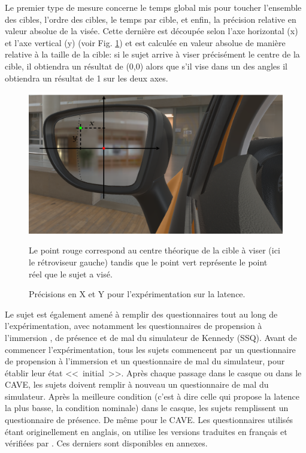 	\par Le premier type de mesure concerne le temps global mis pour toucher l'ensemble des cibles, l'ordre des cibles, le temps par cible, et enfin, la précision relative en valeur absolue de la visée. Cette dernière est découpée selon l'axe horizontal (x) et l'axe vertical (y) (voir Fig. \ref{fig:x_y_precision_latency}) et est calculée en valeur absolue de manière relative à la taille de la cible: si le sujet arrive à viser précisément le centre de la cible, il obtiendra un résultat de (0,0) alors que s'il vise dans un des angles il obtiendra un résultat de 1 sur les deux axes.
	
	\begin{figure}
		\centering
		\includegraphics[scale=.65]{Figures/XYPrecision}
		\caption{Précisions en X et Y pour l'expérimentation sur la latence.}{Le point rouge correspond au centre théorique de la cible à viser (ici le rétroviseur gauche) tandis que le point vert représente le point réel que le sujet a visé.}
		\label{fig:x_y_precision_latency}
	\end{figure}
	
	\par Le sujet est également amené à remplir des questionnaires tout au long de l'expérimentation, avec notamment les questionnaires de propension à l'immersion \citep{witmer_measuring_1998}, de présence \citep{witmer_measuring_1998} et de mal du simulateur de Kennedy (SSQ). Avant de commencer l'expérimentation, tous les sujets commencent par un questionnaire de propension à l'immersion et un questionnaire de mal du simulateur, pour établir leur état <<~initial~>>. Après chaque passage dans le casque ou dans le CAVE, les sujets doivent remplir à nouveau un questionnaire de mal du simulateur. Après la meilleure condition (c'est à dire celle qui propose la latence la plus basse, la condition nominale) dans le casque, les sujets remplissent un questionnaire de présence. De même pour le CAVE. Les questionnaires utilisés étant originellement en anglais, on utilise les versions traduites en français et vérifiées par \cite{bouchard_revising_2007, bouchard_side_2009, bouchard_exploring_2011}. Ces derniers sont disponibles en annexes.
	
